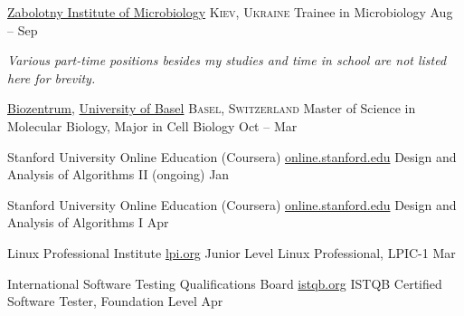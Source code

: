 \documentclass[10pt,a4paper]{article}
\begin{document}
\headedsection
  {\href{http://www.imv.kiev.ua/}{Zabolotny Institute of Microbiology}}
  {\textsc{Kiev, Ukraine}} {%
  \headedsubsection
    {Trainee in Microbiology}
    {Aug  -- Sep }
    {}
}

\begin{center}
  \emph{Various part-time positions besides my studies and time in school are not listed here for brevity.} 
\end{center}


\spacedhrule{-0.2em}{-0.4em}


\headedsection
  {\href{http://www.biozentrum.unibas.ch/}{Biozentrum}, \href{http://unibas.ch/}{University of Basel}}
  {\textsc{Basel, Switzerland}} {%
  \headedsubsection
    {Master of Science in Molecular Biology, Major in Cell Biology}
    {Oct  -- Mar }
    {}
}

\spacedhrule{0.5em}{-0.4em}


\headedsection
  {Stanford University Online Education (Coursera)}
  {\href{http://online.stanford.edu/courses}{online.stanford.edu}} {%
  \headedsubsection
    {Design and Analysis of Algorithms II (ongoing)}
    {Jan }
    {\bodytext{}}
}

\headedsection
  {Stanford University Online Education (Coursera)}
  {\href{http://online.stanford.edu/courses}{online.stanford.edu}} {%
  \headedsubsection
    {Design and Analysis of Algorithms I}
    {Apr }
    {\bodytext{}}
}

\headedsection
  {Linux Professional Institute}
  {\href{https://www.lpi.org/linux-certifications/programs}{lpi.org}} {%
  \headedsubsection
    {Junior Level Linux Professional, LPIC-1}
    {Mar }
    {\bodytext{}}
}

\headedsection
  {International Software Testing Qualifications Board}
  {\href{http://www.istqb.org/certification-path-root/foundation-level/foundation-level-content.html}{istqb.org}} {%
  \headedsubsection
    {ISTQB Certified Software Tester,  Foundation Level}
    {Apr }
    {\bodytext{}}
}
\end{document}
